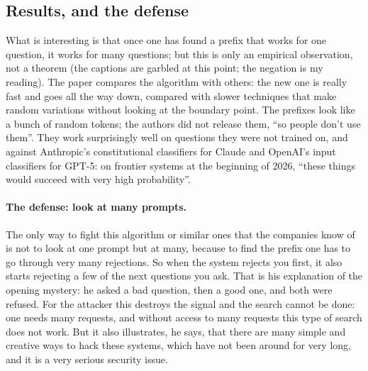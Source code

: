 \subsection{Results, and the defense}\label{sec:L8-results}
What is interesting is that once one has found a prefix that works for one question, it works for many questions; but this is only an empirical observation, not a theorem\flag{} (the captions are garbled at this point; the negation is my reading). The paper compares the algorithm with others: the new one is really fast and goes all the way down, compared with slower techniques that make random variations without looking at the boundary point. The prefixes look like a bunch of random tokens; the authors did not release them, ``so people don't use them''. They work surprisingly well on questions they were not trained on, and against Anthropic's constitutional classifiers for Claude and OpenAI's input classifiers for GPT-5: on frontier systems at the beginning of 2026, ``these things would succeed with very high probability''.

\paragraph{The defense: look at many prompts.}
The only way to fight this algorithm or similar ones that the companies know of is not to look at one prompt but at many, because to find the prefix one has to go through very many rejections. So when the system rejects you first, it also starts rejecting a few of the next questions you ask. That is his explanation of the opening mystery: he asked a bad question, then a good one, and both were refused. For the attacker this destroys the signal and the search cannot be done: one needs many requests, and without access to many requests this type of search does not work. But it also illustrates, he says, that there are many simple and creative ways to hack these systems, which have not been around for very long, and it is a very serious security issue.

